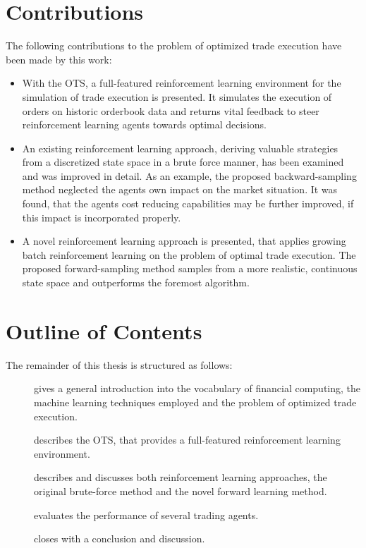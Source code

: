 \section{Contributions}
\label{sec:contributions}
The following contributions to the problem of optimized trade execution have been made by this work:
\begin{itemize}
\item With the \ac{OTS}, a full-featured reinforcement learning environment for the simulation of trade execution is presented. It simulates the execution of orders on historic orderbook data and returns vital feedback to steer reinforcement learning agents towards optimal decisions.

\item An existing reinforcement learning approach, deriving valuable strategies from a discretized state space in a brute force manner, has been examined and was improved in detail. As an example, the proposed backward-sampling method neglected the agents own impact on the market situation. It was found, that the agents cost reducing capabilities may be further improved, if this impact is incorporated properly.

\item A novel reinforcement learning approach is presented, that applies growing batch reinforcement learning on the problem of optimal trade execution. The proposed forward-sampling method samples from a more realistic, continuous state space and outperforms the foremost algorithm.

\end{itemize}

\section{Outline of Contents}
\label{sec:outline}
The remainder of this thesis is structured as follows:

\begin{description}
\item[] gives a general introduction into the vocabulary of financial computing, the machine learning techniques employed and the problem of optimized trade execution.
\item[] describes the \acl{OTS}, that provides a full-featured reinforcement learning environment.
\item[] describes and discusses both reinforcement learning approaches, \ie the original brute-force method and the novel forward learning method.
\item[] evaluates the performance of several trading agents.
\item[] closes with a conclusion and discussion. 

\end{description}


\cleardoublepage{}